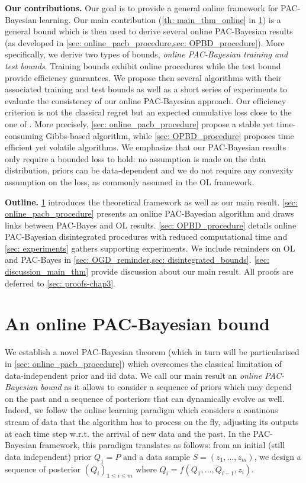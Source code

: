 \textbf{Our contributions.} Our goal is to provide a general online framework for PAC-Bayesian learning. Our main contribution (\cref{th: main_thm_online} in \cref{sec: main_bound}) is a general bound  which is then used to derive several online PAC-Bayesian results (as developed in \cref{sec: online_pacb_procedure,sec: OPBD_procedure}).
More specifically, we derive two types of bounds, \emph{online PAC-Bayesian training and test bounds}.
Training bounds exhibit online procedures while the test bound provide efficiency guarantees. We propose then several algorithms with their associated training and test bounds as well as a short series of experiments to evaluate the consistency of our online PAC-Bayesian approach. Our efficiency criterion is not the classical regret but an expected cumulative loss close to the one of \citet{wintenberger2021stochastic}. More precisely, \cref{sec: online_pacb_procedure} propose a stable yet time-consuming Gibbs-based algorithm, while \cref{sec: OPBD_procedure} proposes time efficient yet volatile algorithms.
We emphasize that our PAC-Bayesian results only require a bounded loss to hold: no assumption is made on the data distribution, priors can be data-dependent and we do not require any convexity assumption on the loss, as commonly assumed in the OL framework.

\textbf{Outline.} \cref{sec: main_bound} introduces the  theoretical framework as well as our main result. \cref{sec: online_pacb_procedure} presents an online PAC-Bayesian algorithm and draws links between PAC-Bayes and OL results.
\cref{sec: OPBD_procedure} details online PAC-Bayesian disintegrated procedures with reduced computational time and \cref{sec: experiments} gathers supporting experiments.
We include reminders on OL and PAC-Bayes in \cref{sec: OGD_reminder,sec: disintegrated_bounds}. \cref{sec: discussion_main_thm} provide discussion about our main result. All proofs are deferred to \cref{sec: proofs-chap3}.

\section{An online PAC-Bayesian bound}
\label{sec: main_bound}
We establish a novel PAC-Bayesian theorem (which in turn will be particularised in \cref{sec: online_pacb_procedure}) which overcomes the classical limitation of data-independent prior and iid data.
We call our main result an \emph{online PAC-Bayesian bound} as it allows to consider a sequence of priors which may depend on the past and a sequence of posteriors that can dynamically evolve as well. Indeed, we follow the online learning paradigm which considers a continous stream of data that the algorithm has to process on the fly, adjusting its outputs at each time step w.r.t. the arrival of new data and the past. In the PAC-Bayesian framework, this paradigm translates as follows: from an initial (still data independent) prior $Q_1=P$ and a data sample $S= (z_1,...,z_m)$, we design a sequence of posterior $(Q_i)_{1\leq i\leq m }$ where $Q_i= f(Q_1,...,Q_{i-1},z_i)$.


